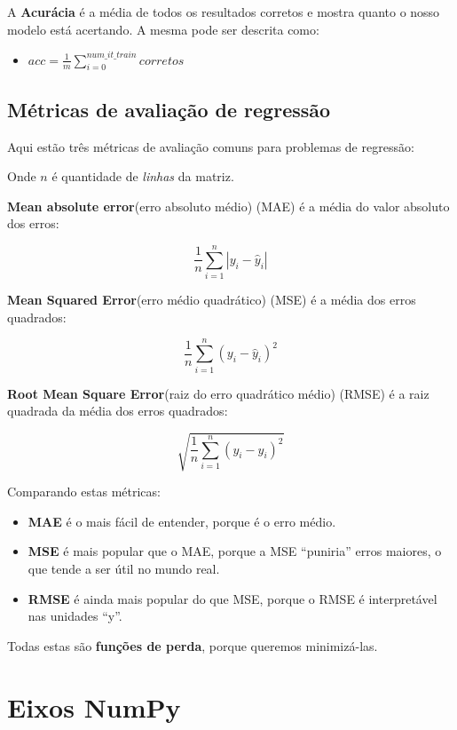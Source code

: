 \documentclass[11pt]{article}
\providecommand{\tightlist}{%
      \setlength{\itemsep}{0pt}\setlength{\parskip}{0pt}}
\begin{document}
A \textbf{Acurácia} é a média de todos os resultados corretos e mostra
quanto o nosso modelo está acertando. A mesma pode ser descrita como:

\begin{itemize}
\tightlist
\item
  \(acc=\frac{1}{m}\sum\limits_{i=0}^{num\_it\_train}corretos\)
\end{itemize}

    \hypertarget{muxe9tricas-de-avaliauxe7uxe3o-de-regressuxe3o}{%
\subsection{Métricas de avaliação de
regressão}\label{muxe9tricas-de-avaliauxe7uxe3o-de-regressuxe3o}}

Aqui estão três métricas de avaliação comuns para problemas de
regressão:

Onde \(n\) é quantidade de \emph{linhas} da matriz.

\textbf{Mean absolute error}(erro absoluto médio) (MAE) é a média do
valor absoluto dos erros:

\[\frac 1n\sum_{i=1}^n|y_i-\hat{y}_i|\]

\textbf{Mean Squared Error}(erro médio quadrático) (MSE) é a média dos
erros quadrados:

\[\frac 1n\sum_{i=1}^n(y_i-\hat{y}_i)^2\]

\textbf{Root Mean Square Error}(raiz do erro quadrático médio) (RMSE) é
a raiz quadrada da média dos erros quadrados:

\[\sqrt{\frac 1n\sum_{i=1}^n(y_i-\hat{y}_i)^2}\]

Comparando estas métricas:

\begin{itemize}
\tightlist
\item
  \textbf{MAE} é o mais fácil de entender, porque é o erro médio.
\item
  \textbf{MSE} é mais popular que o MAE, porque a MSE ``puniria'' erros
  maiores, o que tende a ser útil no mundo real.
\item
  \textbf{RMSE} é ainda mais popular do que MSE, porque o RMSE é
  interpretável nas unidades ``y''.
\end{itemize}

Todas estas são \textbf{funções de perda}, porque queremos minimizá-las.

    \hypertarget{eixos-numpy}{%
\section{Eixos NumPy}\label{eixos-numpy}}
\end{document}
